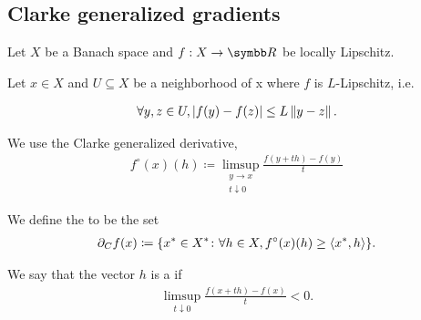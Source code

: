 \subsection{Clarke generalized gradients}\label{sec:clarke_gradients}

Let \( X \) be a Banach space and \( f: X \to \BB{R} \) be locally Lipschitz.

\begin{definition}\label{def:clarke_gradient}\cite[definition 10.3]{Clarke2013}
  Let \( x \in X \) and \( U \subseteq X \) be a neighborhood of x where \( f \) is \( L \)-Lipschitz, i.e.

  \begin{align*}
    \forall y, z \in U, \left\vert f(y) - f(z) \right\vert \leq L \left\Vert y - z \right\Vert.
  \end{align*}

  We use the Clarke generalized derivative,
  \begin{align*}
    f^\circ(x)(h) \coloneqq \limsup_{\substack{y \to x \\ t \downarrow 0}} \frac {f(y + th) - f(y)} t
  \end{align*}

  We define the  to be the set
  \begin{align*}
    \partial_C f(x) \coloneqq \{ x^* \in X^* \colon \forall h \in X, f^\circ(x)(h) \geq \left\langle x^*, h \right\rangle \}.
  \end{align*}

  We say that the vector \( h \) is a  if
  \begin{align*}
    \limsup_{t \downarrow 0} \frac {f(x + th) - f(x)} t < 0.
  \end{align*}
\end{definition}


